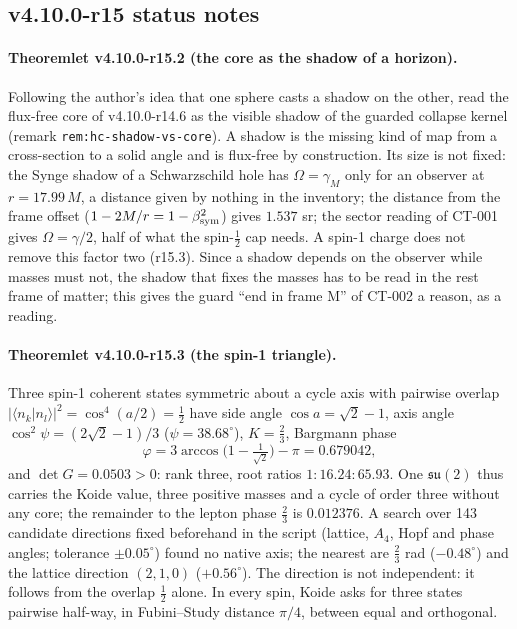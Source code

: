 \subsection*{v4.10.0-r15 status notes}
\label{subsec:v4100-r15-status}

\paragraph{Theoremlet v4.10.0-r15.2 (the core as the shadow of a horizon).}
Following the author's idea that one sphere casts a shadow on the other, read the flux-free core of v4.10.0-r14.6 as the
visible shadow of the guarded collapse kernel (remark \texttt{rem:hc-shadow-vs-core}).  A shadow is the missing kind of map
from a cross-section to a solid angle and is flux-free by construction.  Its size is not fixed: the Synge shadow of a
Schwarzschild hole has \(\Omega=\gamma_M\) only for an observer at \(r=17.99\,M\), a distance given by nothing in the inventory; the
distance from the frame offset (\(1-2M/r=1-\beta_{\rm sym}^2\)) gives \(1.537\) sr; the sector reading of CT-001 gives
\(\Omega=\gamma/2\), half of what the spin-\(\tfrac12\) cap needs.  A spin-1 charge does not remove this factor two (r15.3).  Since a
shadow depends on the observer while masses must not, the shadow that fixes the masses has to be read in the rest frame of
matter; this gives the guard ``end in frame M'' of CT-002 a reason, as a reading.

\paragraph{Theoremlet v4.10.0-r15.3 (the spin-1 triangle).}
Three spin-1 coherent states symmetric about a cycle axis with pairwise overlap \(|\langle n_k|n_l\rangle|^2=\cos^4(a/2)=\tfrac12\)
have side angle \(\cos a=\sqrt2-1\), axis angle \(\cos^2\psi=(2\sqrt2-1)/3\) (\(\psi=38.68^\circ\)), \(K=\tfrac23\), Bargmann phase
\[
\varphi=3\arccos\bigl(1-\tfrac1{\sqrt2}\bigr)-\pi=0.679042,
\]
and \(\det G=0.0503>0\): rank three, root ratios \(1:16.24:65.93\).  One \(\mathfrak{su}(2)\) thus carries the Koide value, three
positive masses and a cycle of order three without any core; the remainder to the lepton phase \(\tfrac23\) is \(0.012376\).  A
search over 143 candidate directions fixed beforehand in the script (lattice, \(A_4\), Hopf and phase angles; tolerance
\(\pm0.05^\circ\)) found no native axis; the nearest are \(\tfrac23\) rad (\(-0.48^\circ\)) and the lattice direction \((2,1,0)\)
(\(+0.56^\circ\)).  The direction is not independent: it follows from the overlap \(\tfrac12\) alone.  In every spin, Koide asks for
three states pairwise half-way, in Fubini--Study distance \(\pi/4\), between equal and orthogonal.

